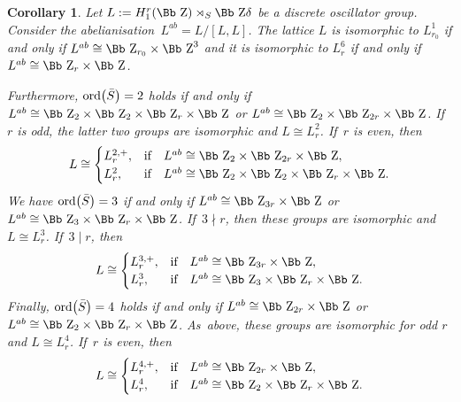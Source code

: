 \documentclass[10pt,a4paper]{amsart}
\newcommand\ZZ{{\mbox{\Bb Z}}}
\newcommand{\ord}{{\rm ord}}
\numberwithin{equation}{section}
\newtheorem{Corollary}[Theorem]{Corollary}
\begin{document}
\begin{Corollary}\label{co:iso}
Let $L:=H_1^r(\ZZ)\rtimes_S \ZZ \delta$ be a discrete oscillator group.
Consider the abelianisation~$L^{ab}=L/[L,L]$.
The lattice $L$ is isomorphic to $L^1_{r_0}$ if and only if $L^{ab}\cong\ZZ_{r_0}\times \ZZ^3$ and it is isomorphic to $L^6_r$ if and only if $L^{ab}\cong \ZZ_r\times\ZZ$.

Furthermore, $\ord\big(\bar S\big)=2$ holds if and only if $L^{ab}\cong\ZZ_2\times\ZZ_2\times\ZZ_r\times\ZZ$ or $L^{ab}\cong\ZZ_2\times\ZZ_{2r}\times\ZZ$. If~$r$ is odd, the latter two groups are isomorphic and $L\cong L^2_r$. If~$r$ is even, then
\begin{gather*}
L\cong \begin{cases}
L^{2,+}_{r}, & \text{if}\quad L^{ab}\cong\ZZ_2\times\ZZ_{2r}\times\ZZ,
\\
L^2_{r}, & \text{if}\quad L^{ab}\cong\ZZ_2\times\ZZ_2\times\ZZ_r\times\ZZ.
\end{cases}
\end{gather*}
We have $\ord\big(\bar S\big)=3$ if and only if
$L^{ab}\cong\ZZ_{3r}\times\ZZ$ or
$L^{ab}\cong\ZZ_3\times\ZZ_r\times\ZZ$. If~$3\nmid r$, then these groups are isomorphic and $L\cong L^3_r$. If~$3\mid r$, then
\begin{gather*}
L\cong\begin{cases}
L^{3,+}_{r}, & \text{if}\quad L^{ab}\cong\ZZ_{3r}\times\ZZ,
\\
L^3_{r}, & \text{if}\quad L^{ab}\cong\ZZ_3\times\ZZ_r\times\ZZ.
\end{cases}
\end{gather*}
Finally, $\ord\big(\bar S\big)=4$ holds if and only if
$L^{ab}\cong\ZZ_{2r}\times\ZZ$ or $L^{ab}\cong\ZZ_2\times\ZZ_r\times\ZZ$. As~above, these groups are isomorphic for odd $r$ and
$L\cong L^4_r$. If~$r$ is even, then
\begin{gather*}
L\cong \begin{cases}
L^{4,+}_{r}, & \text{if}\quad L^{ab}\cong\ZZ_{2r}\times\ZZ,
\\
L^4_{r}, & \text{if}\quad L^{ab}\cong\ZZ_2\times\ZZ_r\times\ZZ.
\end{cases}
\end{gather*}
\end{Corollary}
\end{document}
